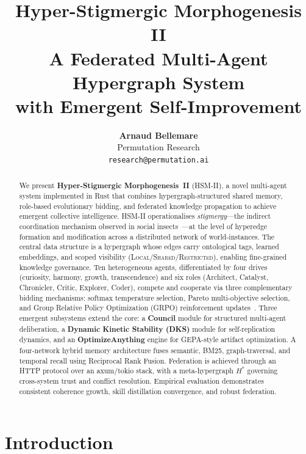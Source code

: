 \documentclass[11pt]{article}
\title{
  \vspace{-0.5em}
  \LARGE\textbf{Hyper-Stigmergic Morphogenesis II}\\[0.4em]
  \large A Federated Multi-Agent Hypergraph System\\
  with Emergent Self-Improvement
  \vspace{-0.3em}
}
\author{
  \textbf{Arnaud Bellemare} \\[0.2em]
  Permutation Research \\
  \texttt{research@permutation.ai}
}
\date{}
\begin{document}
\maketitle
\thispagestyle{empty}

\begin{abstract}
\noindent
We present \textbf{Hyper-Stigmergic Morphogenesis~II} (HSM-II), a novel multi-agent
system implemented in Rust that combines hypergraph-structured shared memory,
role-based evolutionary bidding, and federated knowledge propagation to achieve
emergent collective intelligence. HSM-II operationalises \emph{stigmergy}---the
indirect coordination mechanism observed in social insects~\cite{grasse1959}---at
the level of hyperedge formation and modification across a distributed network of
world-instances. The central data structure is a hypergraph whose edges carry
ontological tags, learned embeddings, and scoped visibility
(\textsc{Local}/\textsc{Shared}/\textsc{Restricted}), enabling fine-grained
knowledge governance. Ten heterogeneous agents, differentiated by four drives
(curiosity, harmony, growth, transcendence) and six roles (Architect, Catalyst,
Chronicler, Critic, Explorer, Coder), compete and cooperate via three
complementary bidding mechanisms: softmax temperature selection, Pareto
multi-objective selection, and Group Relative Policy Optimization (GRPO)
reinforcement updates~\cite{shao2024grpo}. Three emergent subsystems extend
the core: a \textbf{Council} module for structured multi-agent deliberation,
a \textbf{Dynamic Kinetic Stability (DKS)} module for self-replication dynamics,
and an \textbf{OptimizeAnything} engine for GEPA-style artifact optimization.
A four-network hybrid memory architecture fuses semantic, BM25, graph-traversal,
and temporal recall using Reciprocal Rank Fusion. Federation is achieved through
an HTTP protocol over an axum/tokio stack, with a meta-hypergraph $H^*$ governing
cross-system trust and conflict resolution. Empirical evaluation demonstrates
consistent coherence growth, skill distillation convergence, and robust federation.
\end{abstract}

\tableofcontents
\newpage

\section{Introduction}
\label{sec:intro}
\end{document}
